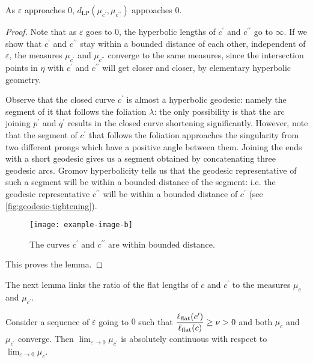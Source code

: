 \documentclass[12pt, reqno]{amsart}
\begin{document}
\begin{lemma}
  \label{lem:flat-length-tightening}
  As $\varepsilon$ approaches $0$, $d_{\mathrm{LP}}(\mu_{c^{\prime}}, \mu_{c^{\prime \prime}})$ approaches $0$.
\end{lemma}
\begin{proof}
  Note that as $\varepsilon$ goes to $0$, the hyperbolic lengths of $c^{\prime}$ and $c^{\prime \prime}$ go to $\infty$.
  If we show that $c^{\prime}$ and $c^{\prime \prime}$ stay within a bounded distance of each other, independent of $\varepsilon$, the measures $\mu_{c^{\prime}}$ and $\mu_{c^{\prime \prime}}$ converge to the same measures, since the intersection points in $\eta$ with $c^{\prime}$ and $c^{\prime \prime}$ will get closer and closer, by elementary hyperbolic geometry.

  Observe that the closed curve $c^{\prime}$ is almost a hyperbolic geodesic: namely the segment of it that follows the foliation $\lambda$: the only possibility is that the arc joining $p^{\prime}$ and $q^{\prime}$ results in the closed curve shortening significantly.
  However, note that the segment of $c^{\prime}$ that follows the foliation approaches the singularity from two different prongs which have a positive angle between them.
  Joining the ends with a short geodesic gives us a segment obtained by concatenating three geodesic arcs.
  Gromov hyperbolicity tells us that the geodesic representative of such a segment will be within a bounded distance of the segment: i.e. the geodesic representative $c^{\prime \prime}$ will be within a bounded distance of $c^{\prime}$ (see \autoref{fig:geodesic-tightening}).
  \begin{figure}[h]
    \centering
    \texttt{[image: example-image-b]}
    \caption{The curves $c^{\prime}$ and $c^{\prime \prime}$ are within bounded distance.}
    \label{fig:geodesic-tightening}
  \end{figure}
  This proves the lemma.
\end{proof}
The next lemma links the ratio of the flat lengths of $c$ and $c^{\prime}$ to the measures $\mu_c$ and $\mu_{c^{\prime}}$.
\begin{lemma}
  \label{lem:absolute-continuity}
  Consider a sequence of $\varepsilon$ going to $0$ such that $\displaystyle \frac{\ell_{\mathrm{flat}}(c^{\prime})}{\ell_{\mathrm{flat}}(c)} \geq \nu > 0$ and both $\mu_c$ and $\mu_{c^{\prime}}$ converge.
  Then $\lim_{\varepsilon \to 0} \mu_{c^{\prime}}$ is absolutely continuous with respect to $\lim_{\varepsilon \to 0} \mu_c$.
\end{lemma}
\end{document}
